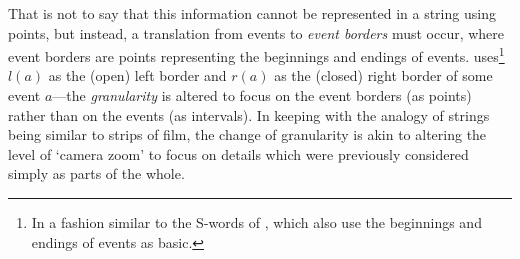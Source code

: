 \documentclass[a4paper,12pt,leqno]{article}
\begin{document}
That is not to say that this information cannot be represented in a string using points, but instead, a translation from events to \textit{event borders} must occur, where event borders are points representing the beginnings and endings of events. \citet{Fernando2018,fernando2018prior} uses\footnote{In a fashion similar to the S-words of \citet{durand2008reasoning,durand2008tool}, which also use the beginnings and endings of events as basic.} $l(a)$ as the (open) left border and $r(a)$ as the (closed) right border of some event $a$---the \textit{granularity} is altered to focus on the event borders (as points) rather than on the events (as intervals). In keeping with the analogy of strings being similar to strips of film, the change of granularity is akin to altering the level of `camera zoom' to focus on details which were previously considered simply as parts of the whole.
\end{document}
